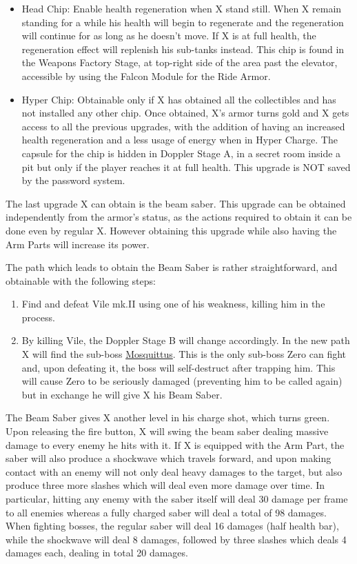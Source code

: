 \begin{itemize}
	
	\item Head Chip: Enable health regeneration when X stand still. When X remain standing for a while his health will begin to regenerate and the regeneration will continue for as long as he doesn't move. If X is at full health, the regeneration effect will replenish his sub-tanks instead. This chip is found in the Weapons Factory Stage, at top-right side of the area past the elevator, accessible by using the Falcon Module for the Ride Armor.
	
	\item Hyper Chip: Obtainable only if X has obtained all the collectibles and has not installed any other chip. Once obtained, X's armor turns gold and X gets access to all the previous upgrades, with the addition of having an increased health regeneration and a less usage of energy when in Hyper Charge. The capsule for the chip is hidden in Doppler Stage A, in a secret room inside a pit but only if the player reaches it at full health. This upgrade is NOT saved by the password system.

\end{itemize}
The last upgrade X can obtain is the beam saber. This upgrade can be obtained independently from the armor's status, as the actions required to obtain it can be done even by regular X. However obtaining this upgrade while also having the Arm Parts will increase its power.

The path which leads to obtain the Beam Saber is rather straightforward, and obtainable with the following steps:
\begin{enumerate}
	\item Find and defeat Vile mk.II using one of his weakness, killing him in the process.
	\item By killing Vile, the Doppler Stage B will change accordingly. In the new path X will find the sub-boss  \hyperlink{miniboss:Mosquittus}{Mosquittus}. This is the only sub-boss Zero can fight and, upon defeating it, the boss will self-destruct after trapping him. This will cause Zero to be seriously damaged (preventing him to be called again) but in exchange he will give X his Beam Saber.
\end{enumerate} 
The Beam Saber gives X another level in his charge shot, which turns green. Upon releasing the fire button, X will swing the beam saber dealing massive damage to every enemy he hits with it. If X is equipped with the Arm Part, the saber will also produce a shockwave which travels forward, and upon making contact with an enemy will not only deal heavy damages to the target, but also produce three more slashes which will deal even more damage over time. In particular, hitting any enemy with the saber itself will deal 30 damage per frame to all enemies whereas a fully charged saber will deal a total of 98 damages. When fighting bosses, the regular saber will deal 16 damages (half health bar), while the shockwave will deal 8 damages, followed by three slashes which deals 4 damages each, dealing in total 20 damages.

